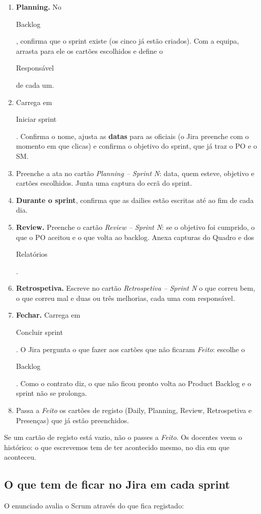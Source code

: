 \documentclass[11pt,a4paper]{article}
\newcommand{\btn}[1]{{\setlength{\fboxsep}{1.6pt}\colorbox{azulclaro}{\sffamily\small\strut #1}}}
\begin{document}
\begin{enumerate}
  \item \textbf{Planning.} No \btn{Backlog}, confirma que o sprint existe (os cinco já estão criados). Com a equipa, arrasta para ele os cartões escolhidos e define o \btn{Responsável} de cada um.
  \item Carrega em \btn{Iniciar sprint}. Confirma o nome, ajusta as \textbf{datas} para as oficiais (o Jira preenche com o momento em que clicas) e confirma o objetivo do sprint, que já traz o PO e o SM.
  \item Preenche a ata no cartão \textit{Planning – Sprint N}: data, quem esteve, objetivo e cartões escolhidos. Junta uma captura do ecrã do sprint.
  \item \textbf{Durante o sprint}, confirma que as dailies estão escritas até ao fim de cada dia.
  \item \textbf{Review.} Preenche o cartão \textit{Review – Sprint N}: se o objetivo foi cumprido, o que o PO aceitou e o que volta ao backlog. Anexa capturas do Quadro e dos \btn{Relatórios}.
  \item \textbf{Retrospetiva.} Escreve no cartão \textit{Retrospetiva – Sprint N} o que correu bem, o que correu mal e duas ou três melhorias, cada uma com responsável.
  \item \textbf{Fechar.} Carrega em \btn{Concluir sprint}. O Jira pergunta o que fazer aos cartões que não ficaram \textit{Feito}: escolhe o \btn{Backlog}. Como o contrato diz, o que não ficou pronto volta ao Product Backlog e o sprint não se prolonga.
  \item Passa a \textit{Feito} os cartões de registo (Daily, Planning, Review, Retrospetiva e Presenças) que já estão preenchidos.
\end{enumerate}

\begin{tcolorbox}[atencao, title={Não inventamos registos}]
  Se um cartão de registo está vazio, não o passes a \textit{Feito}. Os docentes veem o histórico: o que escrevemos tem de ter acontecido mesmo, no dia em que aconteceu.
\end{tcolorbox}

\subsection{O que tem de ficar no Jira em cada sprint}

O enunciado avalia o Scrum através do que fica registado:
\end{document}
